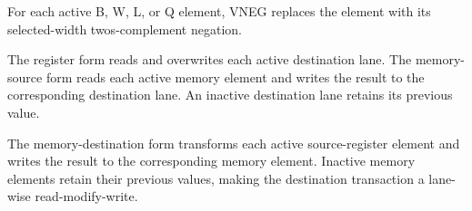 For each active B, W, L, or Q element, VNEG replaces the element with its
selected-width two\textquotesingle{}s-complement negation.

The register form reads and overwrites each active destination lane. The
memory-source form reads each active memory element and writes the result to the
corresponding destination lane. An inactive destination lane retains its
previous value.

The memory-destination form transforms each active source-register element and
writes the result to the corresponding memory element. Inactive memory elements
retain their previous values, making the destination transaction a lane-wise
read-modify-write.
